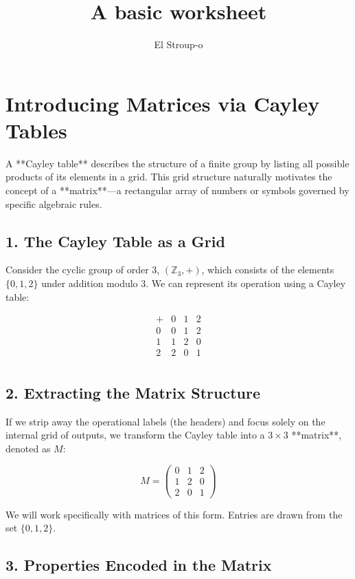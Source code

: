 \documentclass{ximera}
\title{A basic worksheet}
\author{El Stroup-o}
\begin{document}
\section*{Introducing Matrices via Cayley Tables}

A **Cayley table** describes the structure of a finite group by listing all possible products of its elements in a grid. This grid structure naturally motivates the concept of a **matrix**—a rectangular array of numbers or symbols governed by specific algebraic rules.

\subsection*{1. The Cayley Table as a Grid}

Consider the cyclic group of order 3, $(\mathbb{Z}_3, +)$, which consists of the elements $\{0, 1, 2\}$ under addition modulo 3. We can represent its operation using a Cayley table:

\[
\renewcommand{\arraystretch}{1.5}
\begin{array}{c|ccc}
+ & 0 & 1 & 2 \\
\hline
0 & 0 & 1 & 2 \\
1 & 1 & 2 & 0 \\
2 & 2 & 0 & 1 \\
\end{array}
\]

\subsection*{2. Extracting the Matrix Structure}

If we strip away the operational labels (the headers) and focus solely on the internal grid of outputs, we transform the Cayley table into a $3 \times 3$ **matrix**, denoted as $M$:

\[
M = \begin{pmatrix}
0 & 1 & 2 \\
1 & 2 & 0 \\
2 & 0 & 1
\end{pmatrix}
\]

We will work specifically with matrices of this form. Entries are drawn from the set $\{0, 1, 2\}$.

\subsection*{3. Properties Encoded in the Matrix}
\end{document}
